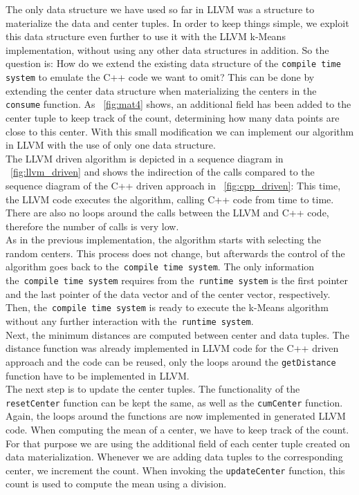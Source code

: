 The only data structure we have used so far in LLVM was a structure to materialize the data and center tuples. In order to keep things simple, we exploit this data structure even further to use it with the LLVM k-Means implementation, without using any other data structures in addition.
So the question is: How do we extend the existing data structure of the \texttt{compile time system} to emulate the C++ code we want to omit? This can be done by extending the center data structure when materializing the centers in the \texttt{consume} function. As ~\autoref{fig:mat4} shows, an additional field has been added to the center tuple to keep track of the count, determining how many data points are close to this center. With this small modification we can implement our algorithm in LLVM with the use of only one data structure.
\\
The LLVM driven algorithm is depicted in a sequence diagram in ~\autoref{fig:llvm_driven} and shows the indirection of the calls compared to the sequence diagram of the C++ driven approach in ~\autoref{fig:cpp_driven}: This time, the LLVM code executes the algorithm, calling C++ code from time to time. There are also no loops around the calls between the LLVM and C++ code, therefore the number of calls is very low. 
\\
As in the previous implementation, the algorithm starts with selecting the random centers. This process does not change, but afterwards the control of the algorithm goes back to the~\texttt{compile time system}. The only information the~\texttt{compile time system} requires from the~\texttt{runtime system} is the first pointer and the last pointer of the data vector and of the center vector, respectively. Then, the~\texttt{compile time system} is ready to execute the k-Means algorithm without any further interaction with the~\texttt{runtime system}. 
\\
Next, the minimum distances are computed between center and data tuples. The distance function was already implemented in LLVM code for the C++ driven approach and the code can be reused, only the loops around the \texttt{getDistance} function have to be implemented in LLVM. 
\\
The next step is to update the center tuples. The functionality of the \texttt{resetCenter} function can be kept the same, as well as the \texttt{cumCenter} function. Again, the loops around the functions are now implemented in generated LLVM code. When computing the mean of a center, we have to keep track of the count. For that purpose we are using the additional field of each center tuple created on data materialization. Whenever we are adding data tuples to the corresponding center, we increment the count. When invoking the \texttt{updateCenter} function, this count is used to compute the mean using a division. 



